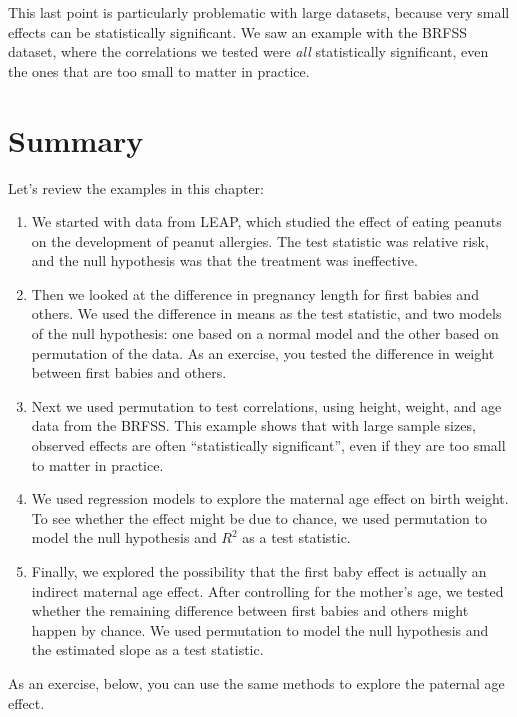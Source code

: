 This last point is particularly problematic with large datasets, because
very small effects can be statistically significant. We saw an example
with the BRFSS dataset, where the correlations we tested were \emph{all}
statistically significant, even the ones that are too small to matter in
practice.

\hypertarget{summary}{%
\section{Summary}\label{summary}}

Let's review the examples in this chapter:

\begin{enumerate}
\def\labelenumi{\arabic{enumi}.}
\item
  We started with data from LEAP, which studied the effect of eating
  peanuts on the development of peanut allergies. The test statistic was
  relative risk, and the null hypothesis was that the treatment was
  ineffective.
\item
  Then we looked at the difference in pregnancy length for first babies
  and others. We used the difference in means as the test statistic, and
  two models of the null hypothesis: one based on a normal model and the
  other based on permutation of the data. As an exercise, you tested the
  difference in weight between first babies and others.
\item
  Next we used permutation to test correlations, using height, weight,
  and age data from the BRFSS. This example shows that with large sample
  sizes, observed effects are often ``statistically significant'', even
  if they are too small to matter in practice.
\item
  We used regression models to explore the maternal age effect on birth
  weight. To see whether the effect might be due to chance, we used
  permutation to model the null hypothesis and \(R^2\) as a test
  statistic.
\item
  Finally, we explored the possibility that the first baby effect is
  actually an indirect maternal age effect. After controlling for the
  mother's age, we tested whether the remaining difference between first
  babies and others might happen by chance. We used permutation to model
  the null hypothesis and the estimated slope as a test statistic.
\end{enumerate}

As an exercise, below, you can use the same methods to explore the
paternal age effect.


